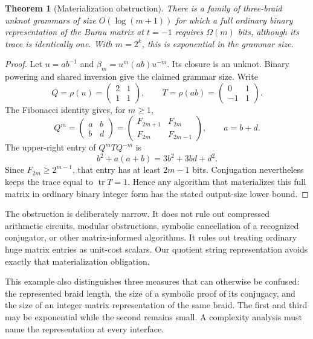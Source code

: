 \documentclass[11pt,letterpaper]{article}
\newtheorem{theorem}{Theorem}[section]
\theoremstyle{definition}\newtheorem{definition}[theorem]{Definition}
\theoremstyle{remark}\newtheorem{remark}[theorem]{Remark}
\newcommand{\tr}{\operatorname{tr}}
\begin{document}
\begin{theorem}[Materialization obstruction]\label{thm:matrix}
There is a family of three-braid unknot grammars of size $O(\log(m+1))$ for which a full ordinary binary representation of the Burau matrix at $t=-1$ requires $\Omega(m)$ bits, although its trace is identically one. With $m=2^k$, this is exponential in the grammar size.
\end{theorem}
\begin{proof}
Let $u=ab^{-1}$ and $\beta_m=u^m(ab)u^{-m}$. Its closure is an unknot. Binary powering and shared inversion give the claimed grammar size. Write
\[
 Q=\rho(u)=\begin{pmatrix}2&1\\1&1\end{pmatrix},\qquad
 T=\rho(ab)=\begin{pmatrix}0&1\\-1&1\end{pmatrix}.
\]
The Fibonacci identity gives, for $m\ge1$,
\[
 Q^m=\begin{pmatrix}a&b\\b&d\end{pmatrix}
 =\begin{pmatrix}F_{2m+1}&F_{2m}\\F_{2m}&F_{2m-1}\end{pmatrix},
 \qquad a=b+d.
\]
The upper-right entry of $Q^mTQ^{-m}$ is
\[
 b^2+a(a+b)=3b^2+3bd+d^2.
\]
Since $F_{2m}\ge2^{m-1}$, that entry has at least $2m-1$ bits. Conjugation nevertheless keeps the trace equal to $\tr T=1$. Hence any algorithm that materializes this full matrix in ordinary binary integer form has the stated output-size lower bound.
\end{proof}

The obstruction is deliberately narrow. It does not rule out compressed arithmetic circuits, modular obstructions, symbolic cancellation of a recognized conjugator, or other matrix-informed algorithms. It rules out treating ordinary huge matrix entries as unit-cost scalars. Our quotient string representation avoids exactly that materialization obligation.

This example also distinguishes three measures that can otherwise be confused: the represented braid length, the size of a symbolic proof of its conjugacy, and the size of an integer matrix representation of the same braid. The first and third may be exponential while the second remains small. A complexity analysis must name the representation at every interface.
\end{document}

